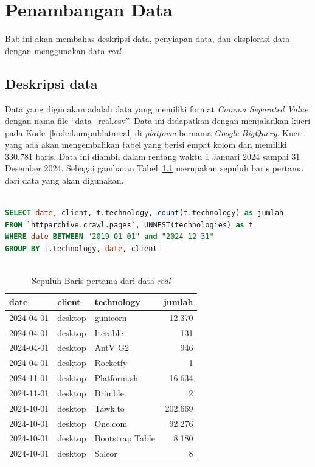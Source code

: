 \chapter{Penambangan Data}
\label{ch:penambangan}

Bab ini akan membahas deskripsi data, penyiapan data, dan eksplorasi data dengan menggunakan data \textit{real}

\section{Deskripsi data}
\label{sec:descdat}

Data yang digunakan adalah data yang memiliki format \textit{Comma Separated Value} dengan nama file ``data\_real.csv''. Data ini didapatkan dengan menjalankan kueri pada Kode~\ref{kode:kumpuldatareal} di \textit{platform} bernama \textit{Google BigQuery}. Kueri yang ada akan mengembalikan tabel yang berisi empat kolom dan memiliki 330.781 baris. Data ini diambil dalam rentang waktu 1 Januari 2024 sampai 31 Desember 2024. Sebagai gambaran Tabel~\ref{tab:sepuluhreal} merupakan sepuluh baris pertama dari data yang akan digunakan.

\begin{lstlisting}[language=SQL, caption=Kode untuk mengumpulkan data \textit{real}, label=kode:kumpuldatareal]

SELECT date, client, t.technology, count(t.technology) as jumlah
FROM `httparchive.crawl.pages`, UNNEST(technologies) as t 
WHERE date BETWEEN "2019-01-01" and "2024-12-31"
GROUP BY t.technology, date, client
    
\end{lstlisting}
\begin{table}[H]
\centering
\caption{Sepuluh Baris pertama dari data \textit{real}}
\label{tab:sepuluhreal}
\begin{tabular}{|l|l|l|r|}
\hline
date & client & technology & jumlah \\ \hline
2024-04-01 & desktop & gunicorn & 12.370 \\ \hline
2024-04-01 & desktop & Iterable & 131 \\ \hline
2024-04-01 & desktop & AntV G2 & 946 \\ \hline
2024-04-01 & desktop & Rocketfy & 1 \\ \hline
2024-11-01 & desktop & Platform.sh & 16.634 \\ \hline
2024-11-01 & desktop & Brimble & 2 \\ \hline
2024-10-01 & desktop & Tawk.to & 202.669 \\ \hline
2024-10-01 & desktop & One.com & 92.276 \\ \hline
2024-10-01 & desktop & Bootstrap Table & 8.180 \\ \hline
2024-10-01 & desktop & Saleor & 8 \\ \hline
\end{tabular}
\end{table}

